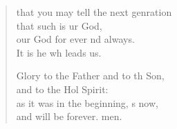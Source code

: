 \begin{verse}
\begin{patverse}
that you may tell the next genration\Med\\
that such is ur God,\\
our God for ever nd always.\Med\\
It is he wh leads us.

Glory to the Father and to th Son,\Med\\
and to the Hol Spirit:\\
as it was in the beginning, \pointup{\i}s now,\Med\\
and will be forever. men. 
  \end{patverse}
\end{verse}
